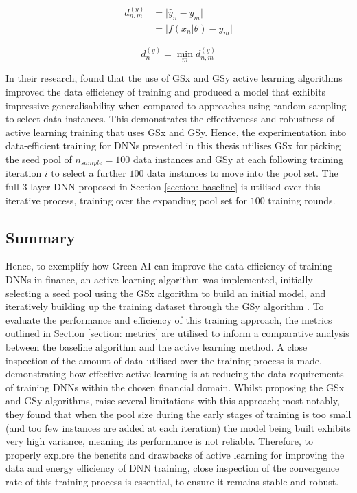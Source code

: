 \documentclass[a4paper, 11pt]{report}
\begin{document}
    \begin{align}
        \label{eq: GSy-distance}
        d^{(y)}_{n, m} &= \lvert \hat{y}_n - y_m \lvert \\
        &= \lvert f( x_n \vert \theta ) - y_m \lvert
    \end{align}
  
    \begin{equation}
        \label{eq: GSy-min}
        d^{(y)}_n = \min_m d^{(y)}_{n, m}
    \end{equation}


    In their research, \citet{wu-2019} found that the use of GSx and GSy active learning algorithms improved the data efficiency of training and produced a model that exhibits impressive generalisability when compared to approaches using random sampling to select data instances. This demonstrates the effectiveness and robustness of active learning training that uses GSx and GSy. Hence, the experimentation into data-efficient training for DNNs presented in this thesis utilises GSx for picking the seed pool of $n_{sample} = 100$ data instances and GSy at each following training iteration $i$ to select a further $100$ data instances to move into the pool set. The full $3$-layer DNN proposed in Section \ref{section: baseline} is utilised over this iterative process, training over the expanding pool set for $100$ training rounds.


    \subsection{Summary}

    Hence, to exemplify how Green AI can improve the data efficiency of training DNNs in finance, an active learning algorithm was implemented, initially selecting a seed pool using the GSx algorithm \citep{wu-2019} to build an initial model, and iteratively building up the training dataset through the GSy algorithm \citep{wu-2019}. To evaluate the performance and efficiency of this training approach, the metrics outlined in Section \ref{section: metrics} are utilised to inform a comparative analysis between the baseline algorithm and the active learning method. A close inspection of the amount of data utilised over the training process is made, demonstrating how effective active learning is at reducing the data requirements of training DNNs within the chosen financial domain. Whilst proposing the GSx and GSy algorithms, \citet{wu-2019} raise several limitations with this approach; most notably, they found that when the pool size during the early stages of training is too small (and too few instances are added at each iteration) the model being built exhibits very high variance, meaning its performance is not reliable. Therefore, to properly explore the benefits and drawbacks of active learning for improving the data and energy efficiency of DNN training, close inspection of the convergence rate of this training process is essential, to ensure it remains stable and robust.
\end{document}

